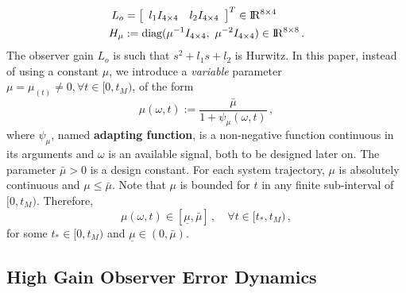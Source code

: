 \documentclass[letterpaper, 10 pt, conference]{ieeeconf}  %
\def\re{{\rm I}\! {\rm R}}
\theoremstyle{plain}
\theoremstyle{definition}
\theoremstyle{remark}
\newtheorem*{remark}{Remark}
\begin{document}
%
\begin{subequations}
	\label{eq:defLhgo_and_Hhgo}
	\begin{align}
		L_o &= \left[\begin{array}{cc}  l_1 I_{4 \times 4} & l_2 I_{4 \times 4} \end{array} \right]^T \in \re^{8 \times 4} 
		\\
		H_\mu &:= \mbox{diag}(\mu^{-1}  I_{4 \times 4}, \ \mu^{-2} I_{4 \times 4}) \in \re^{8 \times 8}\,.
	\end{align}
\end{subequations}
%
%
%
The observer gain $L_o$ is such that $s^{2}+l_1
s+ l_2$ is Hurwitz. In this paper,
instead of using a constant $\mu$, we introduce a {\em variable}
parameter $\mu=\mu_(t)\neq\!0, \forall t\in[0,t_M)$, %
of the form
%
\begin{equation}
\mu(\omega,t):=\frac{\bar{\mu}}{1+
\psi_\mu(\omega,t)}\,,\label{eq:def_mu}
\end{equation}
%
where $\psi_\mu$, named \textbf{adapting function}, is a
non-negative function continuous in its
arguments and $\omega$ is an available signal, both to be designed later on. The parameter $\bar{\mu}\!>\!0$ is a design constant. For each
system trajectory, $\mu$ is absolutely continuous and
$\mu\!\leq\!\bar{\mu}$. Note that $\mu$ is bounded for $t$ in any
finite sub-interval of $[0,t_M)$. Therefore,
%
\begin{equation}
\mu(\omega,t)\in[\underline{\mu},\bar{\mu}]\,, \quad \forall
t\!\in\![t_*,t_M)\,, \label{eq:P3}
\end{equation}
%
for some $t_* \in [0,t_M)$ and
$\underline{\mu}\!\in\!(0,\bar{\mu})$. 



\subsection{High Gain Observer Error Dynamics}
\end{document}
